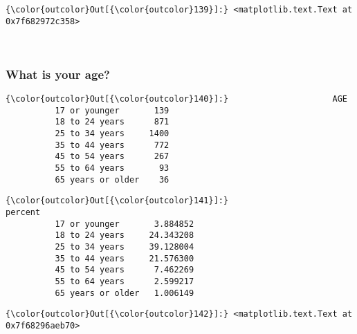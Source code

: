 \documentclass[11pt]{article}
\begin{document}
            \begin{Verbatim}[commandchars=\\\{\}]
{\color{outcolor}Out[{\color{outcolor}139}]:} <matplotlib.text.Text at 0x7f682972c358>
\end{Verbatim}
        
    \begin{center}
    \end{center}
    { \hspace*{\fill} \\}
    

    \subsubsection{What is your age?}\label{what-is-your-age}


            \begin{Verbatim}[commandchars=\\\{\}]
{\color{outcolor}Out[{\color{outcolor}140}]:}                     AGE
          17 or younger       139
          18 to 24 years      871
          25 to 34 years     1400
          35 to 44 years      772
          45 to 54 years      267
          55 to 64 years       93
          65 years or older    36
\end{Verbatim}
        

            \begin{Verbatim}[commandchars=\\\{\}]
{\color{outcolor}Out[{\color{outcolor}141}]:}                      percent
          17 or younger       3.884852
          18 to 24 years     24.343208
          25 to 34 years     39.128004
          35 to 44 years     21.576300
          45 to 54 years      7.462269
          55 to 64 years      2.599217
          65 years or older   1.006149
\end{Verbatim}
        

            \begin{Verbatim}[commandchars=\\\{\}]
{\color{outcolor}Out[{\color{outcolor}142}]:} <matplotlib.text.Text at 0x7f68296aeb70>
\end{Verbatim}
        
    \begin{center}
    \end{center}
    { \hspace*{\fill} \\}
    
\end{document}

